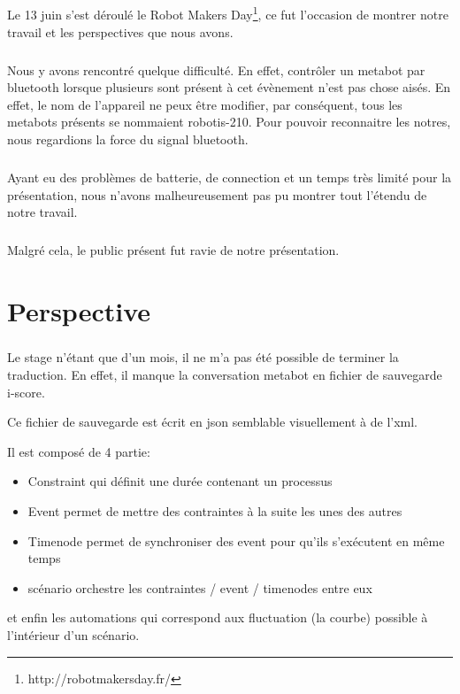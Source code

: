 \documentclass[10pt,a4paper]{report}
\begin{document}
\paragraph{}
Le 13 juin s'est déroulé le Robot Makers Day\footnote{http://robotmakersday.fr/}, ce fut l'occasion de montrer notre travail et les perspectives que nous avons.
\paragraph{}
Nous y avons rencontré quelque difficulté. En effet, contrôler un metabot par bluetooth lorsque plusieurs sont présent à cet évènement n'est pas chose aisés. En effet, le nom de l'appareil ne peux être modifier, par conséquent, tous les metabots présents se nommaient robotis-210. Pour pouvoir reconnaitre les notres, nous regardions la force du signal bluetooth.
\paragraph{}
Ayant eu des problèmes de batterie, de connection et un temps très limité pour la présentation, nous n'avons malheureusement pas pu montrer tout l'étendu de notre travail.
\paragraph{}
Malgré cela, le public présent fut ravie de notre présentation.

\paragraph{}
\chapter{Perspective}
\paragraph{}
Le stage n'étant que d'un mois, il ne m'a pas été possible de terminer la traduction. En effet, il manque la conversation metabot en fichier de sauvegarde i-score.

Ce fichier de sauvegarde est écrit en \acrfull{json} semblable visuellement à de l'xml.

Il est composé de 4 partie:
\begin{itemize}
\item Constraint qui définit une durée contenant un processus
\item Event permet de mettre des contraintes à la suite les unes des autres
\item Timenode permet de synchroniser des event pour qu'ils s'exécutent en même temps
\item scénario orchestre les contraintes / event / timenodes entre eux
\end{itemize}
et enfin les automations qui correspond aux fluctuation (la courbe) possible à l'intérieur d'un scénario.
\end{document}
